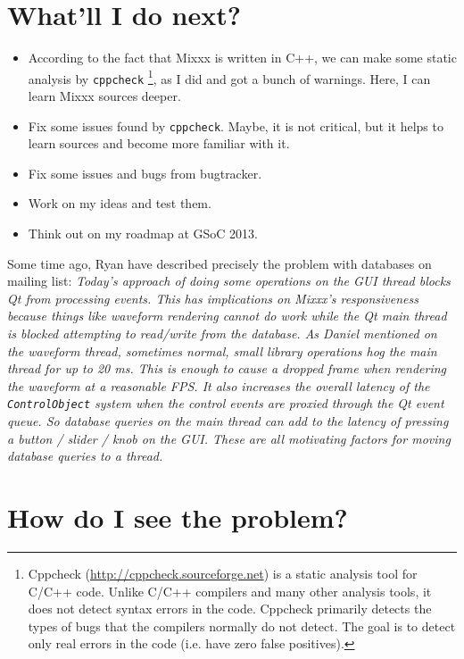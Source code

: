 \documentclass[a4paper,12pt]{scrartcl}
\begin{document}
\section{What'll I do next?}
\begin{itemize}
 \item According to the fact that Mixxx is written in C++, we can make some static analysis by 
    \texttt{cppcheck}%
    \footnote{Cppcheck (\url{http://cppcheck.sourceforge.net}) is a static analysis tool for C/C++
    code. Unlike C/C++ compilers and many other analysis tools, it does not detect syntax errors in 
    the code. Cppcheck primarily detects the types of bugs that the compilers normally do not detect. 
    The goal is to detect only real errors in the code (i.e. have zero false positives).},
 as I did and got a bunch of warnings. Here, I can learn Mixxx sources deeper.
 \item Fix some issues found by \texttt{cppcheck}. Maybe, it is not critical, but it helps to learn 
    sources and become more familiar with it.
 \item Fix some issues and bugs from bugtracker.
 \item Work on my ideas and test them.
 \item Think out on my roadmap at GSoC 2013.
\end{itemize}

Some time ago, Ryan have described precisely the problem with databases on mailing list:
\textit{ Today's approach of doing some operations on the GUI thread blocks Qt from processing events. 
This has implications on Mixxx's responsiveness because things like waveform rendering cannot do work 
while the Qt main thread is blocked attempting to read/write from the database. As Daniel mentioned on 
the waveform thread, sometimes normal, small library operations hog the main thread for up to 20 ms. 
This is enough to cause a dropped frame when rendering the waveform at a reasonable FPS. It also increases 
the overall latency of the \texttt{ControlObject} system when the control events are proxied through 
the Qt event queue. So database queries on the main thread can add to the latency of pressing a button 
/ slider / knob on the GUI. These are all motivating factors for moving database queries to a thread.}


\section{How do I see the problem?}
\end{document}
